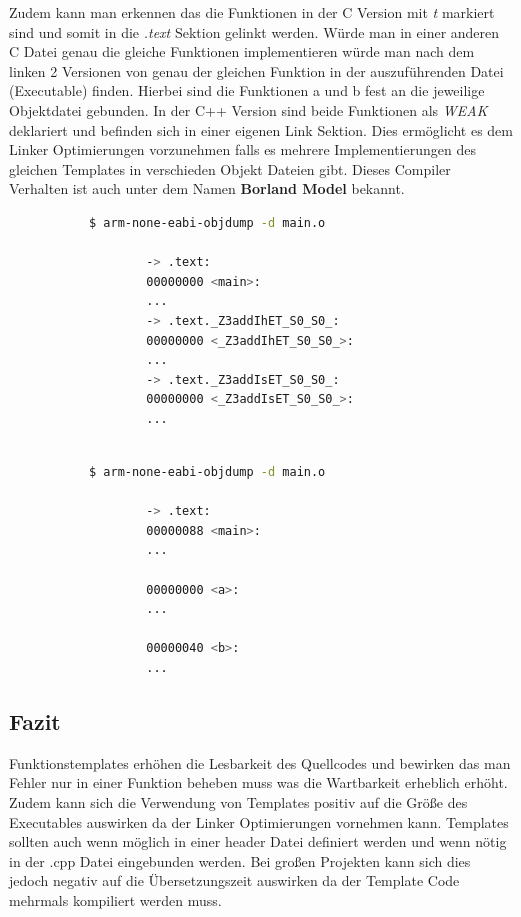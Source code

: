 \documentclass[MES,Master,ngerman]{twbook}%
\begin{document}
Zudem kann man erkennen das die Funktionen in der C Version mit \textit{t} markiert sind und somit in die \textit{.text} Sektion gelinkt werden. Würde man in einer anderen C Datei genau die gleiche Funktionen implementieren würde man nach dem linken 2 Versionen von genau der gleichen Funktion in der auszuführenden Datei (Executable) finden. Hierbei sind die Funktionen a und b fest an die jeweilige Objektdatei gebunden. In der C++ Version sind beide Funktionen als \textit{WEAK} deklariert und befinden sich in einer eigenen Link Sektion. Dies ermöglicht es dem Linker Optimierungen vorzunehmen falls es mehrere Implementierungen des gleichen Templates in verschieden Objekt Dateien gibt. Dieses Compiler Verhalten ist auch unter dem Namen \textbf{Borland Model} bekannt.

\begin{figure}[!htb]
	\begin{subfigure}[b]{0.5\textwidth}
		\begin{lstlisting}[gobble=6, title={Analyse C++}, language=bash, numbers=none]
		$ arm-none-eabi-objdump -d main.o

		-> .text:
		00000000 <main>:
		...
		-> .text._Z3addIhET_S0_S0_:
		00000000 <_Z3addIhET_S0_S0_>:
		...
		-> .text._Z3addIsET_S0_S0_:
		00000000 <_Z3addIsET_S0_S0_>:
		...
		
		\end{lstlisting}
	\end{subfigure}
	\begin{subfigure}[b]{0.5\textwidth}
		\begin{lstlisting}[gobble=6, title={Analyse C}, language=bash, numbers=none]
		$ arm-none-eabi-objdump -d main.o
		
		-> .text:
		00000088 <main>:
		...
		
		00000000 <a>:
		...
		
		00000040 <b>:
		...
		\end{lstlisting}
	\end{subfigure}
\end{figure}

\subsection{Fazit}
Funktionstemplates erhöhen die Lesbarkeit des Quellcodes und bewirken das man Fehler nur in einer Funktion beheben muss was die Wartbarkeit erheblich erhöht. Zudem kann sich die Verwendung von Templates positiv auf die Größe des Executables auswirken da der Linker Optimierungen vornehmen kann. Templates sollten auch wenn möglich in einer header Datei definiert werden und wenn nötig in der .cpp Datei eingebunden werden. Bei großen Projekten kann sich dies jedoch negativ auf die Übersetzungszeit auswirken da der Template Code mehrmals kompiliert werden muss.
\newpage
\end{document}
